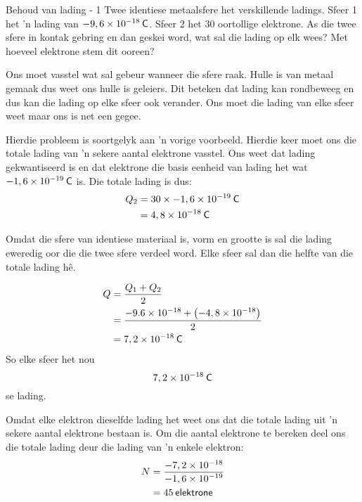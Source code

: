 \begin{wex}{Behoud van lading - 1}
{
Twee identiese metaalsfere het verskillende ladings. Sfeer 1 het 'n lading van $-9,6\ensuremath{\times}{10}^{-18}\phantom{\rule{2pt}{0ex}}\mathsf{C}$. Sfeer 2 het 30 oortollige elektrone. As die twee sfere in kontak gebring en dan geskei word, wat sal die lading op elk wees? Met hoeveel elektrone stem dit ooreen?
}
{
Ons moet vasstel wat sal gebeur wanneer die sfere raak. Hulle is van metaal gemaak dus weet ons hulle is geleiers. Dit beteken dat lading kan rondbeweeg en dus kan die lading op elke sfeer ook verander. Ons moet die lading van elke sfeer weet maar ons is net een gegee.


Hierdie probleem is soortgelyk aan 'n vorige voorbeeld. Hierdie keer moet ons die totale lading van 'n sekere aantal elektrone vasstel. Ons weet dat lading gekwantiseerd is en dat elektrone die basis eenheid van lading het wat  $-1,6\ensuremath{\times}{10}^{-19}\phantom{\rule{2pt}{0ex}}\mathsf{C}$ is. Die totale lading is dus:
    \begin{align*}
    {Q}_{2}&=30\ensuremath{\times}-1,6\ensuremath{\times}{10}^{-19}\phantom{\rule{2pt}{0ex}}\mathsf{C}\\ 
\phantom{x}&=4,8\ensuremath{\times}{10}^{-18}\phantom{\rule{2pt}{0ex}}\mathsf{C}
      \end{align*}



Omdat die sfere van identiese materiaal is, vorm en grootte is sal die lading eweredig oor die die twee sfere verdeel word. Elke sfeer sal dan die helfte van die totale lading h\^e. 
    
\begin{align*}
Q  &=\frac{{Q}_{1}+{Q}_{2}}{2}\\ \phantom{x}&=\frac{-9.6\ensuremath{\times}{10}^{-18}+\left(-4,8\ensuremath{\times}{10}^{-18}\right)}{2}\\ 
    &=7,2\ensuremath{\times}{10}^{-18}\phantom{\rule{2pt}{0ex}}\mathsf{C}
\end{align*}
 So elke sfeer het nou
\begin{equation*}
    7,2\ensuremath{\times}{10}^{-18}\phantom{\rule{2pt}{0ex}}\mathsf{C}
\end{equation*}
     se lading. \par


Omdat elke elektron dieselfde lading het weet ons dat die totale lading uit 'n sekere aantal elektrone bestaan is. Om die aantal elektrone te bereken deel ons die totale lading deur die lading van 'n enkele elektron:
\begin{align*}
     N &=\frac{-7,2\ensuremath{\times}{10}^{-18}}{-1,6\ensuremath{\times}{10}^{-19}}\\ 
\phantom{x}&=45\phantom{\rule{2pt}{0ex}}\mathsf{elektrone} 
    \end{align*}
}\end{wex}




